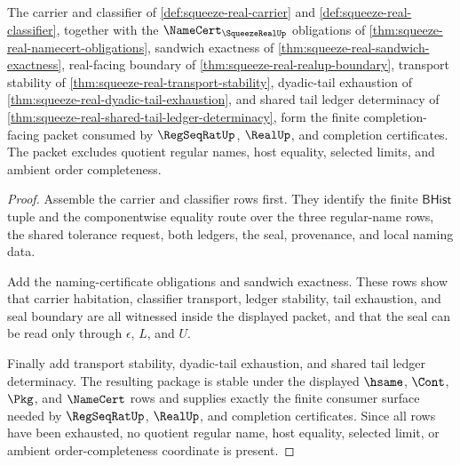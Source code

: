 \begin{theorem}
\label{thm:squeeze-real-completion-consumer-package}
The carrier and classifier of \autoref{def:squeeze-real-carrier} and \autoref{def:squeeze-real-classifier}, together with the $\NameCert_{\SqueezeRealUp}$ obligations of \autoref{thm:squeeze-real-namecert-obligations}, sandwich exactness of \autoref{thm:squeeze-real-sandwich-exactness}, real-facing boundary of \autoref{thm:squeeze-real-realup-boundary}, transport stability of \autoref{thm:squeeze-real-transport-stability}, dyadic-tail exhaustion of \autoref{thm:squeeze-real-dyadic-tail-exhaustion}, and shared tail ledger determinacy of \autoref{thm:squeeze-real-shared-tail-ledger-determinacy}, form the finite completion-facing packet consumed by $\RegSeqRatUp$, $\RealUp$, and completion certificates. The packet excludes quotient regular names, host equality, selected limits, and ambient order completeness.
\end{theorem}
\begin{proof}
Assemble the carrier and classifier rows first. They identify the finite $\mathsf{BHist}$ tuple and the componentwise equality route over the three regular-name rows, the shared tolerance request, both ledgers, the seal, provenance, and local naming data.

Add the naming-certificate obligations and sandwich exactness. These rows show that carrier habitation, classifier transport, ledger stability, tail exhaustion, and seal boundary are all witnessed inside the displayed packet, and that the seal can be read only through $\epsilon$, $L$, and $U$.

Finally add transport stability, dyadic-tail exhaustion, and shared tail ledger determinacy. The resulting package is stable under the displayed $\hsame$, $\Cont$, $\Pkg$, and $\NameCert$ rows and supplies exactly the finite consumer surface needed by $\RegSeqRatUp$, $\RealUp$, and completion certificates. Since all rows have been exhausted, no quotient regular name, host equality, selected limit, or ambient order-completeness coordinate is present.
\end{proof}

